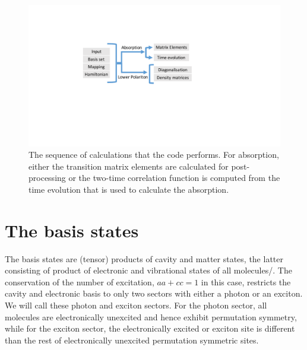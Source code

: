 \documentclass[final,twocolumn]{elsarticle}
\newcommand{\az}[1]{{\color{magenta}{#1}}}
\newcommand{\cntset}{\mathcal{P}_N}
\newcommand{\maptoN}{{{\mathcal{M}}}_{N-1 \mapsto N}}
\begin{document}
\begin{small}
  
\vspace{2cm}




\begin{figure}[t]
\centering
\includegraphics[width=0.8\columnwidth]{flow}
\caption{ The sequence of calculations %
that the code performs. %
For absorption, either the transition matrix elements are calculated for post-processing or
the two-time correlation function is computed from the time evolution that is used to calculate
the absorption.
 \label{fig:flow}
 }
\end{figure}



\section{The basis states}

The basis states are (tensor) products of cavity and matter states, the latter consisting of product of electronic and vibrational states of all molecules/\az{sites}. 
The conservation of the number of excitation,
$aa+cc=1$ in this case,
restricts the cavity and electronic basis to only two sectors with either a photon or an exciton. 
We will call these photon and exciton sectors.
For the photon sector, all molecules are electronically unexcited and hence exhibit permutation symmetry,
while for the exciton sector, the electronically excited or exciton site is different 
than the rest of electronically unexcited permutation symmetric sites.


\end{small}
\end{document}
